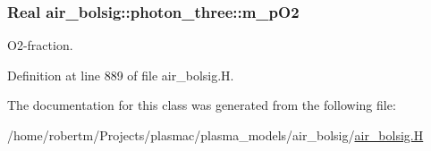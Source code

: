 \subsubsection[{\texorpdfstring{m\+\_\+p\+O2}{m_pO2}}]{\setlength{\rightskip}{0pt plus 5cm}Real air\+\_\+bolsig\+::photon\+\_\+three\+::m\+\_\+p\+O2\hspace{0.3cm}{\ttfamily [protected]}}\hypertarget{classair__bolsig_1_1photon__three_a4781b1db6755e8364ca9060c3687da2f}{}\label{classair__bolsig_1_1photon__three_a4781b1db6755e8364ca9060c3687da2f}


O2-\/fraction. 



Definition at line 889 of file air\+\_\+bolsig.\+H.



The documentation for this class was generated from the following file\+:\begin{DoxyCompactItemize}
\item 
/home/robertm/\+Projects/plasmac/plasma\+\_\+models/air\+\_\+bolsig/\hyperlink{air__bolsig_8H}{air\+\_\+bolsig.\+H}\end{DoxyCompactItemize}
